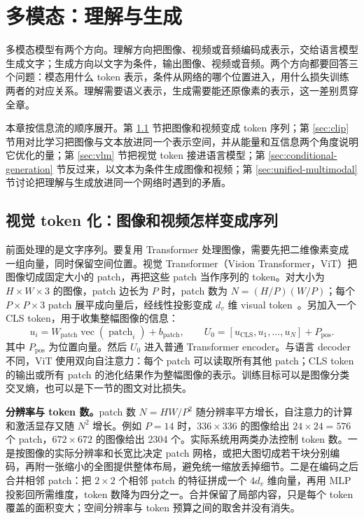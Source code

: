 \chapter{多模态：理解与生成}
\label{chap:multimodal}

\begin{keybox}
多模态模型有两个方向。理解方向把图像、视频或音频编码成表示，交给语言模型生成文字；生成方向以文字为条件，输出图像、视频或音频。两个方向都要回答三个问题：模态用什么 token 表示，条件从网络的哪个位置进入，用什么损失训练两者的对应关系。理解需要语义表示，生成需要能还原像素的表示，这一差别贯穿全章。
\end{keybox}

本章按信息流的顺序展开。第 \ref{sec:visual-tokens} 节把图像和视频变成 token 序列；第 \ref{sec:clip} 节用对比学习把图像与文本放进同一个表示空间，并从能量和互信息两个角度说明它优化的量；第 \ref{sec:vlm} 节把视觉 token 接进语言模型；第 \ref{sec:conditional-generation} 节反过来，以文本为条件生成图像和视频；第 \ref{sec:unified-multimodal} 节讨论把理解与生成放进同一个网络时遇到的矛盾。

\section{视觉 token 化：图像和视频怎样变成序列}
\label{sec:visual-tokens}

前面处理的是文字序列。要复用 Transformer 处理图像，需要先把二维像素变成一组向量，同时保留空间位置。视觉 Transformer（Vision Transformer，ViT）把图像切成固定大小的 patch，再把这些 patch 当作序列的 token。对大小为 \(H\times W\times 3\) 的图像，patch 边长为 \(P\) 时，patch 数为 \(N=(H/P)(W/P)\)；每个 \(P\times P\times3\) patch 展平成向量后，经线性投影变成 \(d_v\) 维 visual token~\cite{dosovitskiy2021vit}。另加入一个 CLS token，用于收集整幅图像的信息：
\begin{equation}
 u_i=W_{\mathrm{patch}}\operatorname{vec}(\operatorname{patch}_i)+b_{\mathrm{patch}},
 \qquad U_0=[u_{\mathrm{CLS}},u_1,\ldots,u_N]+P_{\mathrm{pos}}.
\end{equation}
其中 \(P_{\mathrm{pos}}\) 为位置向量。然后 \(U_0\) 进入普通 Transformer encoder。与语言 decoder 不同，ViT 使用双向自注意力：每个 patch 可以读取所有其他 patch；CLS token 的输出或所有 patch 的池化结果作为整幅图像的表示。训练目标可以是图像分类交叉熵，也可以是下一节的图文对比损失。

\textbf{分辨率与 token 数。}patch 数 \(N=HW/P^2\) 随分辨率平方增长，自注意力的计算和激活显存又随 \(N^2\) 增长。例如 \(P=14\) 时，\(336\times336\) 的图像给出 \(24\times24=576\) 个 patch，\(672\times672\) 的图像给出 2304 个。实际系统用两类办法控制 token 数。一是按图像的实际分辨率和长宽比决定 patch 网格，或把大图切成若干块分别编码，再附一张缩小的全图提供整体布局，避免统一缩放丢掉细节。二是在编码之后合并相邻 patch：把 \(2\times2\) 个相邻 patch 的特征拼成一个 \(4d_v\) 维向量，再用 MLP 投影回所需维度，token 数降为四分之一。合并保留了局部内容，只是每个 token 覆盖的面积变大；空间分辨率与 token 预算之间的取舍并没有消失。

